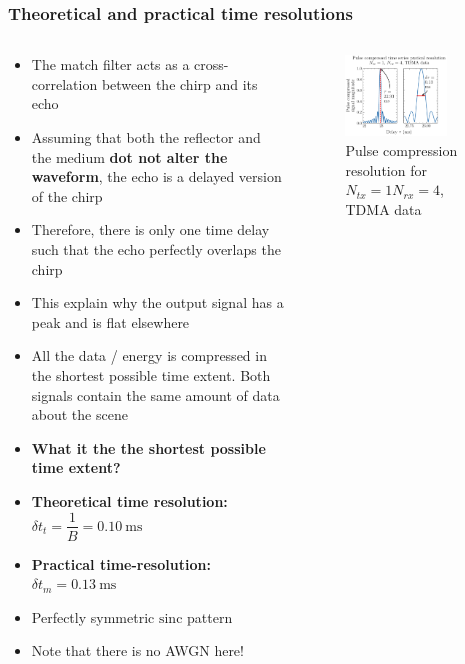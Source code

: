 \documentclass[UKenglish,8pt,aspectratio=1610]{beamer}
\begin{document}
\begin{frame}
	\frametitle{Theoretical and practical time resolutions}
\begin{columns}
	\begin{column}{0.5\textwidth}
		\begin{itemize}
			\item The match filter acts as a cross-correlation between the chirp and its echo
			\item Assuming that both the reflector and the medium \textbf{dot not alter the waveform}, the echo is a delayed version of the chirp
			\item Therefore, there is only one time delay such that the echo perfectly overlaps the chirp 
			\item This explain why the output signal has a peak and is flat elsewhere
			\item All the data / energy is compressed in the shortest possible time extent. Both signals contain the same amount of data about the scene
			\item \textbf{What it the the shortest possible time extent? }
			\item \textbf{Theoretical time resolution:} $\delta t_{t} = \dfrac{1}{B}= 0.10~\si{\milli\second}$
			\item \textbf{Practical time-resolution:} $\delta t_{m} = 0.13~\si{\milli\second}$
			\item Perfectly symmetric $\mathrm{sinc}$ pattern
			\item Note that there is no AWGN here! 
		\end{itemize}
	\end{column}

\begin{column}{0.5\textwidth}
	\begin{figure}[h!]
	\includegraphics[width=0.8\textwidth]{question1/pulse_compressed_time_resolution_1_4.pdf}
	\centering
	\caption{Pulse compression resolution for $N_{tx}=1$$N_{rx}=4$, TDMA data}
\end{figure}
\end{column}
\end{columns}
\end{frame}
\end{document}

